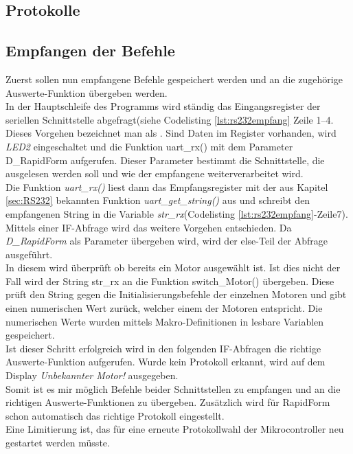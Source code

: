 \subsection{Protokolle}
\subsection{Empfangen der Befehle}
Zuerst sollen nun empfangene Befehle gespeichert werden und an die zugehörige Auswerte-Funktion übergeben werden.\\
In der Hauptschleife des Programms wird ständig das Eingangsregister der seriellen Schnittstelle abgefragt(siehe Codelisting \ref{lst:rs232empfang} Zeile 1--4. Dieses Vorgehen bezeichnet man als .
Sind Daten im Register vorhanden, wird \emph{LED2} eingeschaltet und die Funktion uart\_rx() mit dem Parameter D\_RapidForm aufgerufen. Dieser Parameter bestimmt die Schnittstelle, die ausgelesen werden soll und wie der empfangene  weiterverarbeitet wird. \\
Die Funktion \emph{uart\_rx()} liest dann das Empfangsregister mit der aus Kapitel \ref{sec:RS232} bekannten Funktion \emph{uart\_get\_string()} aus und schreibt den empfangenen String in die Variable \emph{str\_rx}(Codelisting \ref{lst:rs232empfang}-Zeile7).\\
Mittels einer IF-Abfrage wird das weitere Vorgehen entschieden. Da \emph{D\_RapidForm} als Parameter übergeben wird, wird der else-Teil der Abfrage ausgeführt.\\
In diesem wird überprüft ob bereits ein Motor ausgewählt ist. Ist dies nicht der Fall wird der String str\_rx an die Funktion switch\_Motor() übergeben. Diese prüft den String gegen die Initialisierungsbefehle der einzelnen Motoren und gibt einen numerischen Wert zurück, welcher einem der Motoren entspricht. Die numerischen Werte wurden mittels Makro-Definitionen in lesbare Variablen gespeichert.\\
Ist dieser Schritt erfolgreich wird in den folgenden IF-Abfragen die richtige Auswerte-Funktion aufgerufen. Wurde kein Protokoll erkannt, wird auf dem Display \emph{Unbekannter Motor!} ausgegeben.\\
Somit ist es mir möglich Befehle beider Schnittstellen zu empfangen und an die richtigen Auswerte-Funktionen zu übergeben. Zusätzlich wird für RapidForm schon automatisch das richtige Protokoll eingestellt.\\
Eine Limitierung ist, das für eine erneute Protokollwahl der Mikrocontroller neu gestartet werden müsste.


